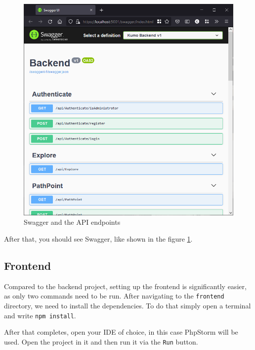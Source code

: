 \begin{figure}[htbp]
	\centering
		\includegraphics[scale=0.6]{./figures/chapter4/backend_swagger.png}
	\caption{Swagger and the API endpoints}
	\label{FigBackendSwagger}
\end{figure}

After that, you should see Swagger, like shown in the figure \ref{FigBackendSwagger}.

\subsection{Frontend}
Compared to the backend project, setting up the frontend is significantly easier, as only two commands need to be run. After navigating to the \verb|frontend| directory, we need to install the dependencies. To do that simply open a terminal and write \verb|npm install|.

After that completes, open your IDE of choice, in this case PhpStorm will be used. Open the project in it and then run it via the \verb|Run| button.

